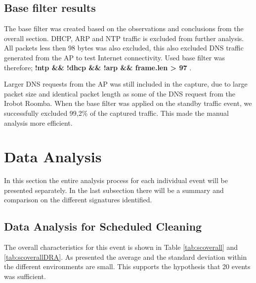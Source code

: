 \subsection{Base filter results}
The base filter was created based on the observations and conclusions from the overall section. DHCP, ARP and NTP traffic is excluded from further analysis. All packets less then 98 bytes was also excluded, this also excluded DNS traffic generated from the AP to test Internet connectivity. Used base filter was therefore; \textbf{!ntp \&\& !dhcp \&\& !arp \&\& frame.len > 97} \cite{wireshark}.

Larger DNS requests from the AP was still included in the capture, due to large packet size and identical packet length as some of the DNS request from the Irobot Roomba. When the base filter was applied on the standby traffic event, we successfully excluded 99,2\% of the captured traffic. This made the manual analysis more efficient. 

\section{Data Analysis}
In this section the entire analysis process for each individual event will be presented separately. In the last subsection there will be a summary and comparison on the different signatures identified.

\subsection{Data Analysis for Scheduled Cleaning}
The overall characteristics for this event is shown in Table \ref{tab:scoverall} and \ref{tab:scoverallDRA}. As presented the average and the standard deviation within the different environments are small. This supports the hypothesis that 20 events was sufficient.

